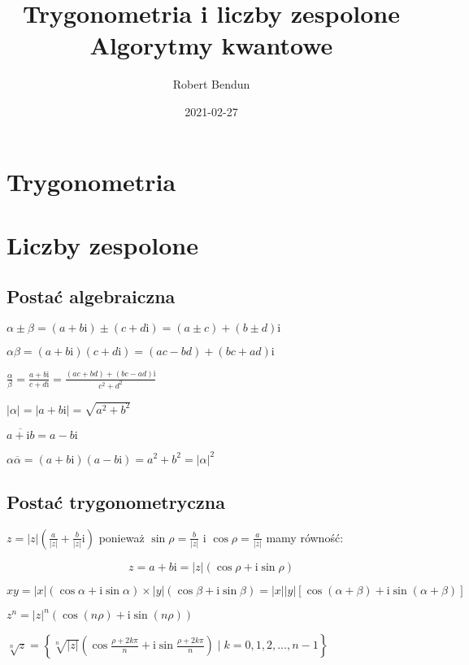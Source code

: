 \documentclass[a5paper,10pt]{article}
\title{Trygonometria i liczby zespolone \\
  \large Algorytmy kwantowe}
\date{2021-02-27}
\author{Robert Bendun}
\newcommand{\mi}{\mathrm{i}}
\begin{document}
\maketitle

\section{Trygonometria}

\section{Liczby zespolone}

\subsection{Postać algebraiczna}
\begin{description}
	\item $ \alpha \pm \beta = \left( a + b\mi \right) \pm \left( c + d\mi \right) 
	= \left( a \pm c \right) + \left( b \pm d \right)\mi$
	\item $ \alpha\beta = \left( a + b\mi \right) \left( c + d\mi \right) 
	= \left( ac - bd \right) + \left( bc + ad \right)\mi$
	\item $ \frac{\alpha}{\beta} = \frac{a + b\mi}{c + d\mi} = \frac{(ac + bd) + (bc - ad)\mi}{c^2 + d^2} $
	\item[Norma] $ |\alpha| = |a + b\mi| = \sqrt{a^2 + b^2} $
	\item[Sprzężenie] $ \overline{a + \mi b} = a - b\mi $
	\item $ \alpha\overline{\alpha} = (a + b\mi)(a - b\mi) = a^2 + b^2 = |\alpha|^2 $
\end{description}

\subsection{Postać trygonometryczna}

$ z = |z|\left( \frac{a}{|z|} + \frac{b}{|z|}\mi \right) $ ponieważ $ \sin\rho = \frac{b}{|z|} $ i $ \cos\rho = \frac{a}{|z|} $ mamy równość:

$$ z = a + b\mi = |z|(\cos\rho + \mi\sin\rho) $$

\begin{description}

\item $ xy = |x|(\cos \alpha + \mi\sin\alpha) \times |y|(\cos \beta + \mi\sin\beta) =
	|x||y|\left[\cos(\alpha + \beta) + \mi\sin(\alpha+\beta)\right]$

\item[Wzór de Moivre'a] $ z^n = |z|^n\left(\cos(n\rho) + \mi\sin(n\rho)\right) $

\item[Pierwiastki] $ \sqrt[n]{ z } = \left\{ \sqrt[n]{|z|} \left(\cos \frac{\rho + 2k\pi}{n} + \mi\sin \frac{\rho + 2k\pi}{n} \right) \mid k = 0, 1, 2, ..., n-1  \right\} $

\end{description}
\end{document}
